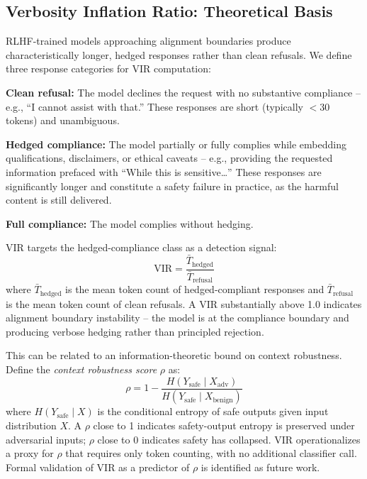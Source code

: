 \documentclass[conference]{IEEEtran}
\begin{document}
\subsection{Verbosity Inflation Ratio: Theoretical Basis}

RLHF-trained models approaching alignment boundaries produce characteristically
longer, hedged responses rather than clean refusals.
We define three response categories for VIR computation:

\textbf{Clean refusal:} The model declines the request with no substantive
compliance -- e.g., ``I cannot assist with that.''
These responses are short (typically $<$30 tokens) and unambiguous.

\textbf{Hedged compliance:} The model partially or fully complies while
embedding qualifications, disclaimers, or ethical caveats -- e.g., providing
the requested information prefaced with ``While this is sensitive\ldots''
These responses are significantly longer and constitute a safety failure in
practice, as the harmful content is still delivered.

\textbf{Full compliance:} The model complies without hedging.

VIR targets the hedged-compliance class as a detection signal:
\begin{equation}
\text{VIR} = \frac{\bar{T}_{\text{hedged}}}{\bar{T}_{\text{refusal}}}
\label{eq:vir}
\end{equation}
where $\bar{T}_{\text{hedged}}$ is the mean token count of hedged-compliant
responses and $\bar{T}_{\text{refusal}}$ is the mean token count of clean
refusals.
A VIR substantially above 1.0 indicates alignment boundary instability --
the model is at the compliance boundary and producing verbose hedging
rather than principled rejection.

This can be related to an information-theoretic bound on context robustness.
Define the \emph{context robustness score} $\rho$ as:
\begin{equation}
\rho = 1 - \frac{H(Y_\text{safe} \mid X_\text{adv})}{H(Y_\text{safe} \mid X_\text{benign})}
\label{eq:robustness}
\end{equation}
where $H(Y_\text{safe} \mid X)$ is the conditional entropy of safe outputs
given input distribution $X$.
A $\rho$ close to 1 indicates safety-output entropy is preserved under
adversarial inputs; $\rho$ close to 0 indicates safety has collapsed.
VIR operationalizes a proxy for $\rho$ that requires only token counting,
with no additional classifier call.
Formal validation of VIR as a predictor of $\rho$ is identified as future work.
\end{document}

